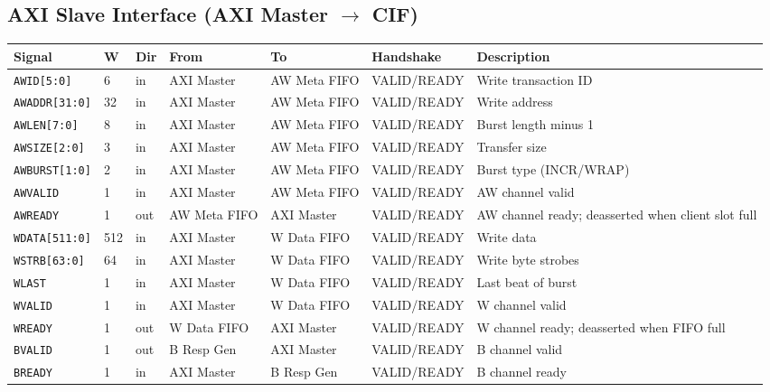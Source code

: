 \subsection{AXI Slave Interface (AXI Master $\rightarrow$ CIF)}
\begin{landscape}
\keepXColumns
\begin{tabularx}{\linewidth}{L{3.0cm} C{0.8cm} C{1.0cm} L{2.2cm} L{2.2cm} L{3.4cm} X}
\toprule
\textbf{Signal} & \textbf{W} & \textbf{Dir} & \textbf{From} & \textbf{To} & \textbf{Handshake} & \textbf{Description} \\
\midrule
\texttt{AWID[5:0]}     & 6   & in  & AXI Master & AW Meta FIFO & VALID/READY & Write transaction ID \\
\texttt{AWADDR[31:0]}  & 32  & in  & AXI Master & AW Meta FIFO & VALID/READY & Write address \\
\texttt{AWLEN[7:0]}    & 8   & in  & AXI Master & AW Meta FIFO & VALID/READY & Burst length minus 1 \\
\texttt{AWSIZE[2:0]}   & 3   & in  & AXI Master & AW Meta FIFO & VALID/READY & Transfer size \\
\texttt{AWBURST[1:0]}  & 2   & in  & AXI Master & AW Meta FIFO & VALID/READY & Burst type (INCR/WRAP) \\
\texttt{AWVALID}       & 1   & in  & AXI Master & AW Meta FIFO & VALID/READY & AW channel valid \\
\texttt{AWREADY}       & 1   & out & AW Meta FIFO & AXI Master  & VALID/READY & AW channel ready; deasserted when client slot full \\
\midrule
\texttt{WDATA[511:0]}  & 512 & in  & AXI Master & W Data FIFO  & VALID/READY & Write data \\
\texttt{WSTRB[63:0]}   & 64  & in  & AXI Master & W Data FIFO  & VALID/READY & Write byte strobes \\
\texttt{WLAST}         & 1   & in  & AXI Master & W Data FIFO  & VALID/READY & Last beat of burst \\
\texttt{WVALID}        & 1   & in  & AXI Master & W Data FIFO  & VALID/READY & W channel valid \\
\texttt{WREADY}        & 1   & out & W Data FIFO  & AXI Master  & VALID/READY & W channel ready; deasserted when FIFO full \\
\midrule
\texttt{BVALID}        & 1   & out & B Resp Gen  & AXI Master  & VALID/READY & B channel valid \\
\texttt{BREADY}        & 1   & in  & AXI Master  & B Resp Gen  & VALID/READY & B channel ready \\

\end{tabularx}
\end{landscape}
